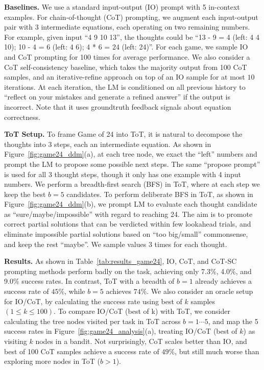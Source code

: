 \documentclass{article}
\begin{document}
\textbf{Baselines.} We use a standard input-output (IO) prompt with 5 in-context examples. For chain-of-thought (CoT) prompting, we augment each input-output pair with 3 intermediate equations, each operating on two remaining numbers. For example, given input ``4 9 10 13'', the thoughts could be ``13 - 9 = 4 (left: 4 4 10); 10 - 4 = 6 (left: 4 6); 4 * 6 = 24 (left: 24)''. For each game, we sample IO and CoT prompting for 100 times for average performance. 
We also consider a CoT self-consistency baseline, which takes the majority output from 100 CoT samples, and an iterative-refine approach on top of an IO sample for at most $10$ iterations. At each iteration, the LM is conditioned on all previous history to ``reflect on your mistakes and generate a refined answer'' if the output is incorrect. Note that it uses groundtruth feedback signals about equation correctness.


\textbf{ToT Setup.} 
To frame Game of 24 into ToT, it is natural to decompose the thoughts into 3 steps, each an intermediate equation. As shown in Figure~\ref{fig:game24_ddm}(a), at each tree node, we exact the ``left'' numbers and prompt the LM to propose some possible next steps. 
The same ``propose prompt'' is used for all 3 thought steps, though it only has one example with 4 input numbers. 
We perform a breadth-first search (BFS) in ToT, where at each step we keep the best $b=5$ candidates. 
To perform deliberate BFS in ToT, as shown in Figure~\ref{fig:game24_ddm}(b), we prompt LM to evaluate each thought candidate as ``sure/maybe/impossible'' with regard to reaching 24. The aim is to promote correct partial solutions that can be verdicted within few lookahead trials, and eliminate impossible partial solutions based on ``too big/small'' commonsense, and keep the rest ``maybe''. We sample values $3$ times for each thought. 


\textbf{Results.} As shown in Table~\ref{tab:results_game24}, IO, CoT, and CoT-SC prompting methods perform badly on the task, achieving only 7.3\%, 4.0\%, and 9.0\% success rates. In contrast, ToT with a breadth of $b=1$ already achieves a success rate of $45\%$, while $b=5$ achieves $74\%$. 
We also consider an oracle setup for IO/CoT, by calculating the success rate using best of $k$ samples $(1\le k\le 100)$. To compare IO/CoT (best of k) with ToT, we consider calculating the tree nodes visited per task in ToT across $b=1\cdots 5$, and map the 5 success rates in Figure~\ref{fig:game24_analysis}(a), treating IO/CoT (best of $k$) as visiting $k$ nodes in a bandit. Not surprisingly, CoT scales better than IO, and best of 100 CoT samples achieve a success rate of $49\%$, but still much worse than exploring more nodes in ToT ($b>1$). %
\end{document}
